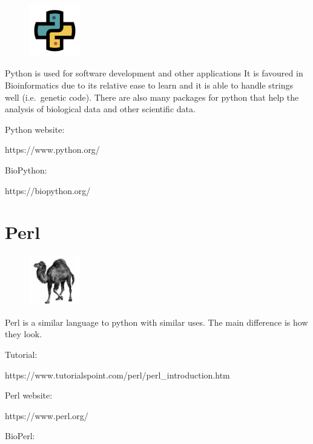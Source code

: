 \documentclass[
  letterpaper,
  DIV=11,
  numbers=noendperiod]{scrreprt}
\begin{document}
\begin{figure}

{\centering \includegraphics[width=0.2\textwidth,height=\textheight]{figures/python.png}

}

\end{figure}

Python is used for software development and other applications It is
favoured in Bioinformatics due to its relative ease to learn and it is
able to handle strings well (i.e.~genetic code). There are also many
packages for python that help the analysis of biological data and other
scientific data.

Python website:

https://www.python.org/

BioPython:

https://biopython.org/

\hypertarget{perl}{%
\section{Perl}\label{perl}}

\begin{figure}

{\centering \includegraphics[width=0.2\textwidth,height=\textheight]{figures/perl.png}

}

\end{figure}

Perl is a similar language to python with similar uses. The main
difference is how they look.

Tutorial:

https://www.tutorialspoint.com/perl/perl\_introduction.htm

Perl website:

https://www.perl.org/

BioPerl:
\end{document}
